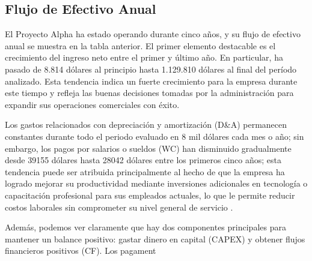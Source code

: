 

\subsection{Flujo de Efectivo Anual}\label{sec:title}


El Proyecto Alpha ha estado operando durante cinco años, y su flujo de efectivo anual se muestra en la tabla anterior. El primer elemento destacable es el crecimiento del ingreso neto entre el primer y último año. En particular, ha pasado de 8.814 dólares al principio hasta 1.129.810 dólares al final del período analizado. Esta tendencia indica un fuerte crecimiento para la empresa durante este tiempo y refleja las buenas decisiones tomadas por la administración para expandir sus operaciones comerciales con éxito. 

Los gastos relacionados con depreciación y amortización (D&A) permanecen constantes durante todo el periodo evaluado en 8 mil dólares cada mes o año; sin embargo, los pagos por salarios o sueldos (WC) han disminuido gradualmente desde 39155 dólares hasta 28042 dólares entre los primeros cinco años; esta tendencia puede ser atribuida principalmente al hecho de que la empresa ha logrado mejorar su productividad mediante inversiones adicionales en tecnología o capacitación profesional para sus empleados actuales, lo que le permite reducir costos laborales sin comprometer su nivel general de servicio . 

Además, podemos ver claramente que hay dos componentes principales para mantener un balance positivo: gastar dinero en capital (CAPEX) y obtener flujos financieros positivos (CF). Los pagament
